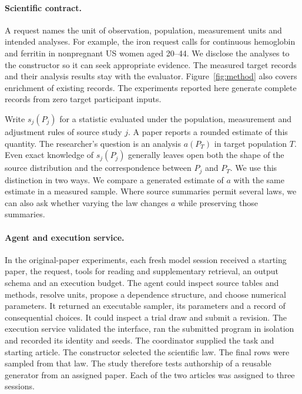 \documentclass[sigconf,anonymous,review]{acmart}
\begin{document}
\paragraph{Scientific contract.}
A request names the unit of observation, population, measurement units and intended analyses. For example, the iron request calls for continuous hemoglobin and ferritin in nonpregnant US women aged 20--44. We disclose the analyses to the constructor so it can seek appropriate evidence. The measured target records and their analysis results stay with the evaluator. Figure~\ref{fig:method} also covers enrichment of existing records. The experiments reported here generate complete records from zero target participant inputs.

Write $s_j(P_j)$ for a statistic evaluated under the population, measurement and adjustment rules of source study $j$. A paper reports a rounded estimate of this quantity. The researcher's question is an analysis $a(P_T)$ in target population $T$. Even exact knowledge of $s_j(P_j)$ generally leaves open both the shape of the source distribution and the correspondence between $P_j$ and $P_T$. We use this distinction in two ways. We compare a generated estimate of $a$ with the same estimate in a measured sample. Where source summaries permit several laws, we can also ask whether varying the law changes $a$ while preserving those summaries.

\paragraph{Agent and execution service.}
In the original-paper experiments, each fresh model session received a starting paper, the request, tools for reading and supplementary retrieval, an output schema and an execution budget. The agent could inspect source tables and methods, resolve units, propose a dependence structure, and choose numerical parameters. It returned an executable sampler, its parameters and a record of consequential choices. It could inspect a trial draw and submit a revision. The execution service validated the interface, ran the submitted program in isolation and recorded its identity and seeds. The coordinator supplied the task and starting article. The constructor selected the scientific law. The final rows were sampled from that law. The study therefore tests authorship of a reusable generator from an assigned paper. Each of the two articles was assigned to three sessions.
\end{document}
